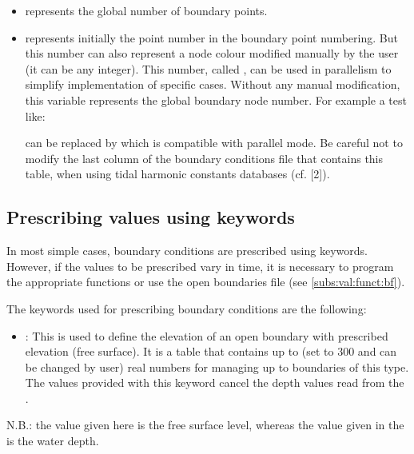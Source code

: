\begin{itemize}
\item {} represents the global number of boundary points.

\item {} represents initially the point number in the boundary point
numbering.
But this number can also represent a node colour modified manually by the user
(it can be any integer).
This number, called , can be used in parallelism
to simplify implementation of specific cases.
Without any manual modification, this variable represents the global boundary
node number.
For example a test like:

 can be replaced by
which is compatible with parallel mode.
Be careful not to modify the last column of the boundary conditions file
that contains this  table,
when using tidal harmonic constants databases (cf. [2]).
\end{itemize}

\subsection{Prescribing values using keywords}
\label{subs:val:key}
In most simple cases, boundary conditions are prescribed using keywords.
However, if the values to be prescribed vary in time, it is necessary to program
the appropriate functions or use the open boundaries file
(see \ref{subs:val:funct:bf}).

The keywords used for prescribing boundary conditions are the following:

\begin{itemize}
\item {}:
This is used to define the elevation of an open boundary with prescribed
elevation (free surface).
It is a table that contains up to 
(set to 300 and can be changed by user) real numbers for managing up to
 boundaries of this type.
The values provided with this keyword cancel the depth values read from
the .
\end{itemize}

N.B.: the value given here is the free surface level, whereas the value given
in the  is the water depth.


